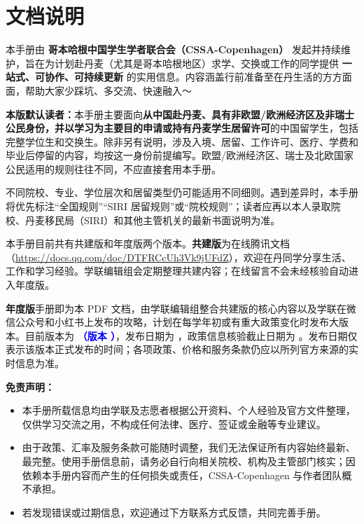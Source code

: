\section{文档说明}\label{sec:docintro}


本手册由 \textbf{哥本哈根中国学生学者联合会（CSSA-Copenhagen）} 发起并持续维护，旨在为计划赴丹麦（尤其是哥本哈根地区）求学、交换或工作的同学提供 \textbf{一站式、可协作、可持续更新} 的实用信息。内容涵盖行前准备至在丹生活的方方面面，帮助大家少踩坑、多交流、快速融入～

\begin{grayleftbox}
\textbf{本版默认读者：}本手册主要面向\textbf{从中国赴丹麦、具有非欧盟/欧洲经济区及非瑞士公民身份，并以学习为主要目的申请或持有丹麦学生居留许可}的中国留学生，包括完整学位生和交换生。除非另有说明，涉及入境、居留、工作许可、医疗、学费和毕业后停留的内容，均按这一身份前提编写。欧盟/欧洲经济区、瑞士及北欧国家公民适用的规则往往不同，不应直接套用本手册。

不同院校、专业、学位层次和居留类型仍可能适用不同细则。遇到差异时，本手册将优先标注“全国规则”“SIRI 居留规则”或“院校规则”；读者应再以本人录取院校、丹麦移民局（SIRI）和其他主管机关的最新书面说明为准。
\end{grayleftbox}

本手册目前共有共建版和年度版两个版本。\textbf{共建版}为在线腾讯文档（\url{https://docs.qq.com/doc/DTFRCcUh3Vk9jUFdZ}），欢迎在丹同学分享生活、工作和学习经验。学联编辑组会定期整理共建内容；在线留言不会未经核验自动进入年度版。

\textbf{年度版}手册即为本 PDF 文档，由学联编辑组整合共建版的核心内容以及学联在微信公众号和小红书上发布的攻略，计划在每学年初或有重大政策变化时发布大版本。目前版本为 \textcolor{blue}{\textbf{\handbookedition（版本 \handbookversion）}}，发布日期为 \textcolor{blue}{\textbf{\handbookdate}}，政策信息核验截止日期为 \textcolor{blue}{\textbf{\verificationdate}}。发布日期仅表示该版本正式发布的时间；各项政策、价格和服务条款仍应以所列官方来源的实时信息为准。

\begin{grayleftbox} \textbf{免责声明： }
\begin{itemize}
 \item 本手册所载信息均由学联及志愿者根据公开资料、个人经验及官方文件整理，仅供学习交流之用，不构成任何法律、医疗、签证或金融等专业建议。
 \item 由于政策、汇率及服务条款可能随时调整，我们无法保证所有内容始终最新、最完整。使用手册信息前，请务必自行向相关院校、机构及主管部门核实；因依赖本手册内容而产生的任何损失或责任，CSSA-Copenhagen 与作者团队概不承担。
 \item 若发现错误或过期信息，欢迎通过下方联系方式反馈，共同完善手册。
\end{itemize}

\end{grayleftbox}

